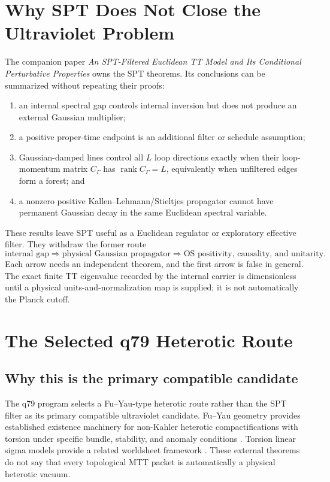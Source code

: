 \documentclass[11pt]{article}
\begin{document}
\section{Why SPT Does Not Close the Ultraviolet Problem}

The companion paper \emph{An SPT-Filtered Euclidean TT Model and Its
Conditional Perturbative Properties} owns the SPT theorems. Its conclusions
can be summarized without repeating their proofs:
\begin{enumerate}
\item an internal spectral gap controls internal inversion but does not
produce an external Gaussian multiplier;
\item a positive proper-time endpoint is an additional filter or schedule
assumption;
\item Gaussian-damped lines control all \(L\) loop directions exactly when
their loop-momentum matrix \(C_\Gamma\) has
\(\operatorname{rank}C_\Gamma=L\), equivalently when unfiltered edges form a
forest; and
\item a nonzero positive Kallen--Lehmann/Stieltjes propagator cannot have
permanent Gaussian decay in the same Euclidean spectral variable.
\end{enumerate}

These results leave SPT useful as a Euclidean regulator or exploratory
effective filter. They withdraw the former route
\[
 \text{internal gap}
 \Longrightarrow
 \text{physical Gaussian propagator}
 \Longrightarrow
 \text{OS positivity, causality, and unitarity}.
\]
Each arrow needs an independent theorem, and the first arrow is false in
general. The exact finite TT eigenvalue recorded by the internal carrier is
dimensionless until a physical units-and-normalization map is supplied; it is
not automatically the Planck cutoff.

\section{The Selected q79 Heterotic Route}

\subsection{Why this is the primary compatible candidate}

The q79 program selects a Fu--Yau-type heterotic route rather than the SPT
filter as its primary compatible ultraviolet candidate. Fu--Yau geometry
provides established existence machinery for non-Kahler heterotic
compactifications with torsion under specific bundle, stability, and anomaly
conditions \cite{FuYau2006}. Torsion linear sigma models provide a related
worldsheet framework \cite{AdamsErnebjergLapan2006}. These external theorems
do not say that every topological MTT packet is automatically a physical
heterotic vacuum.
\end{document}
